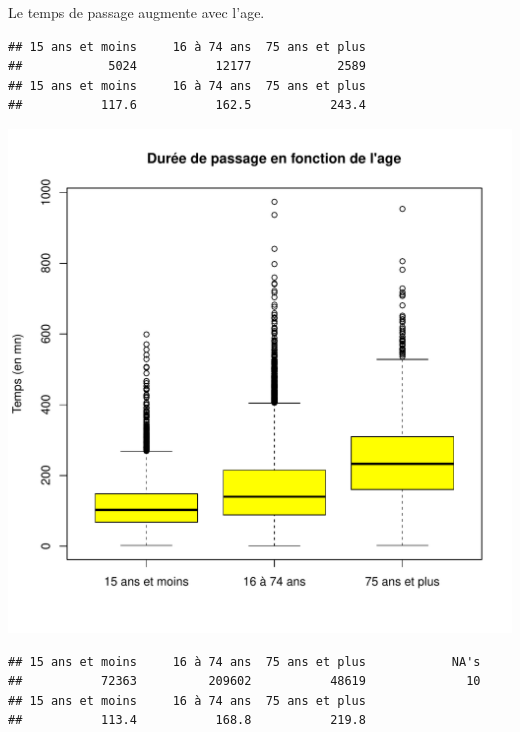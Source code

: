\documentclass[12pt,english,french,twoside]{report}\usepackage[]{graphicx}\usepackage[]{color}
\makeatletter
\def\maxwidth{ %
  \ifdim\Gin@nat@width>\linewidth
    \linewidth
  \else
    \Gin@nat@width
  \fi
}
\newenvironment{kframe}{%
 \def\at@end@of@kframe{}%
 \ifinner\ifhmode%
  \def\at@end@of@kframe{\end{minipage}}%
  \begin{minipage}{\columnwidth}%
 \fi\fi%
 \def\FrameCommand##1{\hskip\@totalleftmargin \hskip-\fboxsep
 \colorbox{shadecolor}{##1}\hskip-\fboxsep
     \hskip-\linewidth \hskip-\@totalleftmargin \hskip\columnwidth}%
 \MakeFramed {\advance\hsize-\width
   \@totalleftmargin\z@ \linewidth\hsize
   \@setminipage}}%
 {\par\unskip\endMakeFramed%
 \at@end@of@kframe}
\newenvironment{knitrout}{}{} %
\makeatother
\begin{document}
Le temps de passage augmente avec l'age.
\begin{knitrout}
\color{fgcolor}\begin{kframe}
\begin{verbatim}
## 15 ans et moins     16 à 74 ans  75 ans et plus 
##            5024           12177            2589
## 15 ans et moins     16 à 74 ans  75 ans et plus 
##           117.6           162.5           243.4
\end{verbatim}
\end{kframe}
\includegraphics[width=\maxwidth]{figure/duree_age1} 
\begin{kframe}\begin{verbatim}
## 15 ans et moins     16 à 74 ans  75 ans et plus            NA's 
##           72363          209602           48619              10
## 15 ans et moins     16 à 74 ans  75 ans et plus 
##           113.4           168.8           219.8
\end{verbatim}
\end{kframe}

\end{knitrout}
\end{document}
